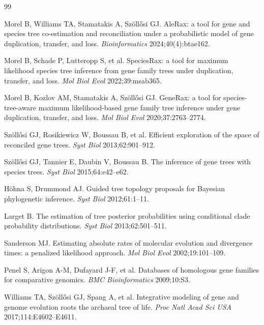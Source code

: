 \documentclass[11pt]{article}
\begin{document}
\begin{thebibliography}{99}
\small

 Morel B, Williams TA, Stamatakis A, Sz\"oll\H{o}si GJ.
AleRax: a tool for gene and species tree co-estimation and reconciliation under
a probabilistic model of gene duplication, transfer, and loss.
\emph{Bioinformatics} 2024;40(4):btae162.

 Morel B, Schade P, Lutteropp S, et al. SpeciesRax: a tool
for maximum likelihood species tree inference from gene family trees under
duplication, transfer, and loss. \emph{Mol Biol Evol} 2022;39:msab365.

 Morel B, Kozlov AM, Stamatakis A, Sz\"oll\H{o}si GJ.
GeneRax: a tool for species-tree-aware maximum likelihood-based gene family tree
inference under gene duplication, transfer, and loss.
\emph{Mol Biol Evol} 2020;37:2763--2774.

 Sz\"oll\H{o}si GJ, Rosikiewicz W, Boussau B, et al.
Efficient exploration of the space of reconciled gene trees.
\emph{Syst Biol} 2013;62:901--912.

 Sz\"oll\H{o}si GJ, Tannier E, Daubin V, Boussau B. The
inference of gene trees with species trees. \emph{Syst Biol} 2015;64:e42--e62.

 H\"ohna S, Drummond AJ. Guided tree topology proposals for
Bayesian phylogenetic inference. \emph{Syst Biol} 2012;61:1--11.

 Larget B. The estimation of tree posterior probabilities
using conditional clade probability distributions.
\emph{Syst Biol} 2013;62:501--511.

 Sanderson MJ. Estimating absolute rates of molecular
evolution and divergence times: a penalized likelihood approach.
\emph{Mol Biol Evol} 2002;19:101--109.

 Penel S, Arigon A-M, Dufayard J-F, et al. Databases of
homologous gene families for comparative genomics.
\emph{BMC Bioinformatics} 2009;10:S3.

 Williams TA, Sz\"oll\H{o}si GJ, Spang A, et al.
Integrative modeling of gene and genome evolution roots the archaeal tree of
life. \emph{Proc Natl Acad Sci USA} 2017;114:E4602--E4611.


\end{thebibliography}
\end{document}
